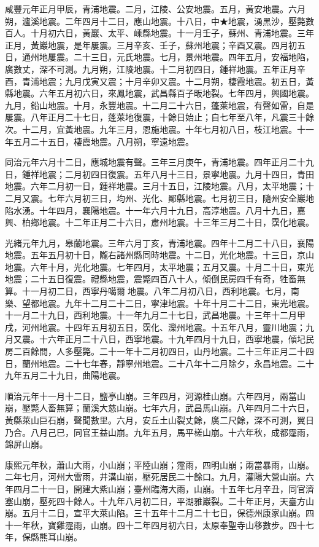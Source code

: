 \begin{pinyinscope}
咸豐元年正月甲辰，青浦地震。二月，江陵、公安地震。五月，黃安地震。六月朔，瀘溪地震。二年四月十二日，應山地震。十八日，中★地震，湧黑沙，壓斃數百人。十月初六日，黃巖、太平、嵊縣地震。十一月壬子，蘇州、青浦地震。三年正月，黃巖地震，是年屢震。三月辛亥、壬子，蘇州地震；辛酉又震。四月初五日，通州地屢震。二十三日，元氏地震。七月，景州地震。四年五月，安福地陷，廣數丈，深不可測。九月朔，江陵地震。十二月初四日，鍾祥地震。五年正月辛酉，青浦地震；九月戊寅又震；十月辛卯又震。十二月朔，棲霞地震。初五日，黃縣地震。六年五月初六日，來鳳地震，武昌縣百子畈地裂。七年四月，興國地震。九月，鉛山地震。十月，永豐地震。十二月二十六日，蓬萊地震，有聲如雷，自是屢震。八年正月二十七日，蓬萊地復震，十餘日始止；自七年至八年，凡震三十餘次。十二月，宜黃地震。九年三月，恩施地震。十年七月初八日，枝江地震。十一年五月二十五日，棲霞地震。八月朔，寧遠地震。

同治元年六月十二日，應城地震有聲。三年三月庚午，青浦地震。四年正月二十九日，鍾祥地震；二月初四日復震。五年八月十三日，景寧地震。九月十四日，青田地震。六年二月初一日，鍾祥地震。三月十五日，江陵地震。八月，太平地震；十二月又震。七年六月初三日，均州、光化、鄖縣地震。七月初三日，隨州安全巖地陷水湧。十年四月，襄陽地震。十一年六月十九日，高淳地震。八月十九日，嘉興、柏鄉地震。十二年正月二十六日，肅州地震。十三年三月二十日，霑化地震。

光緒元年九月，皋蘭地震。三年六月丁亥，青浦地震。四年十二月二十八日，襄陽地震。五年五月初十日，隴右諸州縣同時地震。十二日，光化地震。十三日，京山地震。六年十月，光化地震。七年四月，太平地震；五月又震。十月二十日，東光地震；二十五日復震。禮縣地震，震斃四百八十人，傾倒民房四千有奇，牲畜無算。十一月初二日，西寧丹噶爾地震。八年二月初八日，西利地震。七月，南樂、望都地震。九年十二月二十二日，寧津地震。十年十月二十二日，東光地震。十一月二十九日，西利地震。十一年九月二十七日，武昌地震。十三年十二月甲戌，河州地震。十四年五月初五日，霑化、灤州地震。十五年八月，靈川地震；九月又震。十六年正月二十八日，西寧地震。十九年四月十九日，西寧地震，傾圮民房二百餘間，人多壓斃。二十一年十二月初四日，山丹地震。二十三年正月二十四日，蘭州地震。二十七年春，靜寧州地震。二十八年十二月除夕，永昌地震。二十九年五月二十九日，曲陽地震。

順治元年十一月十二日，鹽亭山崩。三年四月，河源桂山崩。六年四月，兩當山崩，壓斃人畜無算；蘭溪大慈山崩。七年六月，武昌馬山崩。八年四月二十六日，黃縣萊山巨石崩，聲聞數里。六月，安丘土山裂丈餘，廣二尺餘，深不可測，翼日乃合。八月己巳，同官王益山崩。九年五月，馬平槎山崩。十六年秋，成都霪雨，錦屏山崩。

康熙元年秋，蕭山大雨，小山崩；平陸山崩；霪雨，四明山崩；兩當暴雨，山崩。二年七月，河州大雷雨，井溝山崩，壓死居民二十餘口。九月，灌陽大營山崩。六年四月二十一日，開建大紫山崩；臺州臨海大雨，山崩。十五年七月辛丑，同官濟塞山崩，壓死四十餘人。十九年八月初二日，平湖雅巖裂。二十年正月，天臺方山崩。五月十二日，宣平大萊山陷。三十五年十二月二十七日，保德州康家山崩。四十一年秋，寶雞霪雨，山崩。四十二年四月初六日，太原奉聖寺山移數步。四十七年，保縣熊耳山崩。


\end{pinyinscope}
